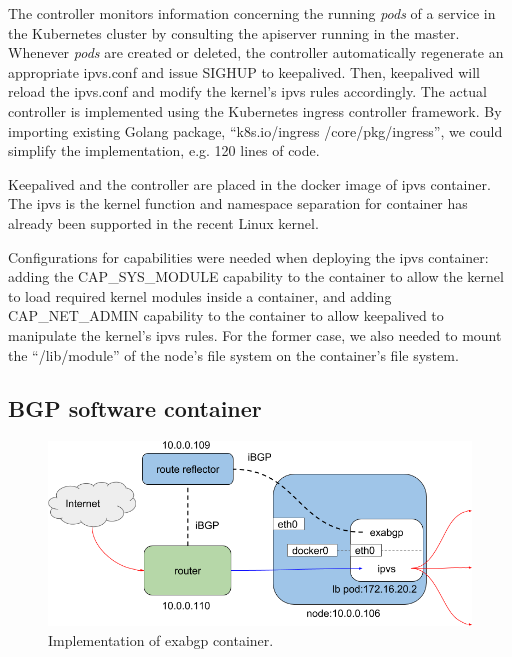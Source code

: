 The controller monitors information concerning the running {\em pods} of a service 
in the Kubernetes cluster by consulting the apiserver running in the master.
Whenever {\em pods} are created or deleted, the controller automatically regenerate an appropriate ipvs.conf 
and issue SIGHUP to keepalived.
Then, keepalived will reload the ipvs.conf and modify the kernel's ipvs rules accordingly.
The actual controller\cite{ktaka_ccmp_2017_826894} is implemented using the Kubernetes ingress controller\cite{K8sIngress2017} framework. 
By importing existing Golang package, \enquote{k8s.io/ingress /core/pkg/ingress}, we could simplify the implementation, e.g. 
120 lines of code.  

Keepalived and the controller are placed in the docker image of ipvs container.
The ipvs is the kernel function and namespace separation for container has already been supported in the recent Linux kernel. 


Configurations for capabilities were needed when deploying the ipvs container: adding the CAP\_SYS\_MODULE capability 
to the container to allow the kernel to load required kernel modules inside a container, 
and adding CAP\_NET\_ADMIN capability to the container to allow keepalived to manipulate the kernel's ipvs rules. 
For the former case, we also needed to mount the \enquote{/lib/module} of the node's file system on the container's file system.

\subsection{BGP software container}

\begin{figure}
\includegraphics[width=\columnwidth]{Figs/exabgp}
\caption{Implementation of exabgp container.}
\label{fig:exabgp}
\end{figure}

